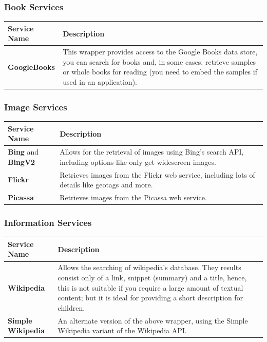 \documentclass[letterpaper,10pt,english]{sphinxmanual}
\begin{document}
\subsubsection{Book Services}
\label{overview:book-services}
\begin{tabulary}{\linewidth}{|L|L|}
\hline
\textbf{
Service Name
} & \textbf{
Description
}\\\hline

\textbf{GoogleBooks}
 & 
This wrapper provides access to the Google Books data store, you can search for books and, in some cases, retrieve samples or whole books for reading (you need to embed the samples if used in an application).
\\\hline
\end{tabulary}



\subsubsection{Image Services}
\label{overview:image-services}
\begin{tabulary}{\linewidth}{|L|L|}
\hline
\textbf{
Service Name
} & \textbf{
Description
}\\\hline

\textbf{Bing} and \textbf{BingV2}
 & 
Allows for the retrieval of images using Bing's search API, including options like only get widescreen images.
\\\hline

\textbf{Flickr}
 & 
Retrieves images from the Flickr web service, including lots of details like geotags and more.
\\\hline

\textbf{Picassa}
 & 
Retrieves images from the Picassa web service.
\\\hline
\end{tabulary}



\subsubsection{Information Services}
\label{overview:information-services}
\begin{tabulary}{\linewidth}{|L|L|}
\hline
\textbf{
Service Name
} & \textbf{
Description
}\\\hline

\textbf{Wikipedia}
 & 
Allows the searching of wikipedia's database. They results consist only of a link, snippet (summary) and a title, hence, this is not suitable if you require a large amount of textual content; but it is ideal for providing a short description for children.
\\\hline

\textbf{Simple Wikipedia}
 & 
An alternate version of the above wrapper, using the Simple Wikipedia variant of the Wikipedia API.
\\\hline
\end{tabulary}
\end{document}
